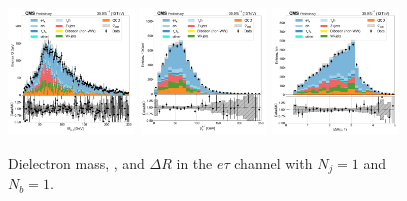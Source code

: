 \begin{figure}[htb!]
    \centering
    \includegraphics[width=0.3\textwidth]{chapters/Appendix/sectionPlots/figures/data_mc_overlays/etau_2016_cat_eq1_eq1_signal_linear_lepton_dilepton1_mass}
    \includegraphics[width=0.3\textwidth]{chapters/Appendix/sectionPlots/figures/data_mc_overlays/etau_2016_cat_eq1_eq1_signal_linear_lepton_dilepton1_pt}
    \includegraphics[width=0.3\textwidth]{chapters/Appendix/sectionPlots/figures/data_mc_overlays/etau_2016_cat_eq1_eq1_signal_linear_lepton_dilepton1_delta_r}
    \caption{Dielectron mass, \pt, and $\Delta R$ in the $e\tau$ channel
    with $N_{j} = 1$ and $N_{b} = 1$.}
    \label{fig:etau_3_dilepton}
\end{figure}

